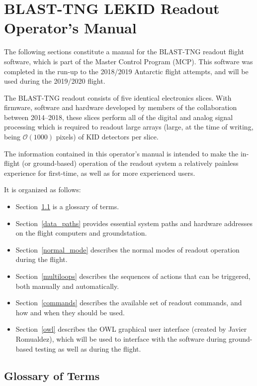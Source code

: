 
\chapter{BLAST-TNG LEKID Readout Operator's Manual}\label{mcp}

The following sections constitute a manual for the BLAST-TNG readout flight software, which is part of the Master Control Program (MCP). This software was completed in the run-up to the 2018/2019 Antarctic flight attempts, and will be used during the 2019/2020 flight.

The BLAST-TNG readout consists of five identical electronics slices. With firmware, software and hardware developed by members of the collaboration between 2014--2018, these slices perform all of the digital and analog signal processing which is required to readout large arrays (large, at the time of writing, being $\mathcal{O}(1000)$ pixels) of KID detectors per slice.

The information contained in this operator’s manual is intended to make the in-flight (or ground-based) operation of the readout system a relatively painless experience for first-time, as well as for more experienced users.

It is organized as follows:
\begin{itemize}[nosep]
  \item Section~\ref{gloss} is a glossary of terms.
  \item Section~\ref{data_paths} provides essential system paths and hardware addresses on the flight computers and groundstation.
  \item Section~\ref{normal_mode} describes the normal modes of readout operation during the flight.
  \item Section~\ref{multiloops} describes the sequences of actions that can be triggered, both manually and automatically.
  \item Section~\ref{commands} describes the available set of readout commands, and how and when they should be used.
  \item Section~\ref{owl} describes the OWL graphical user interface (created by Javier Romualdez), which will be used to interface with the software during ground-based testing as well as during the flight.
\end{itemize}

\section{Glossary of Terms}\label{gloss}

